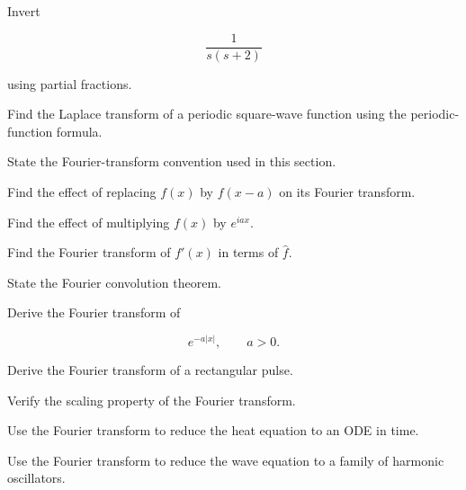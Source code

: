 \begin{exercise}[3]
Invert

\[
\frac{1}{s(s+2)}
\]

using partial fractions.
\end{exercise}

\begin{exercise}[3]
Find the Laplace transform of a periodic square-wave function using the
periodic-function formula.
\end{exercise}

\begin{exercise}[2]
State the Fourier-transform convention used in this section.
\end{exercise}

\begin{exercise}[2]
Find the effect of replacing \(f(x)\) by \(f(x-a)\) on its Fourier transform.
\end{exercise}

\begin{exercise}[2]
Find the effect of multiplying \(f(x)\) by \(e^{iax}\).
\end{exercise}

\begin{exercise}[2]
Find the Fourier transform of \(f'(x)\) in terms of \(\widehat f\).
\end{exercise}

\begin{exercise}[2]
State the Fourier convolution theorem.
\end{exercise}

\begin{exercise}[3]
Derive the Fourier transform of

\[
e^{-a|x|},
\qquad
a>0.
\]
\end{exercise}

\begin{exercise}[3]
Derive the Fourier transform of a rectangular pulse.
\end{exercise}

\begin{exercise}[3]
Verify the scaling property of the Fourier transform.
\end{exercise}

\begin{exercise}[3]
Use the Fourier transform to reduce the heat equation to an ODE in time.
\end{exercise}

\begin{exercise}[3]
Use the Fourier transform to reduce the wave equation to a family of harmonic
oscillators.
\end{exercise}

